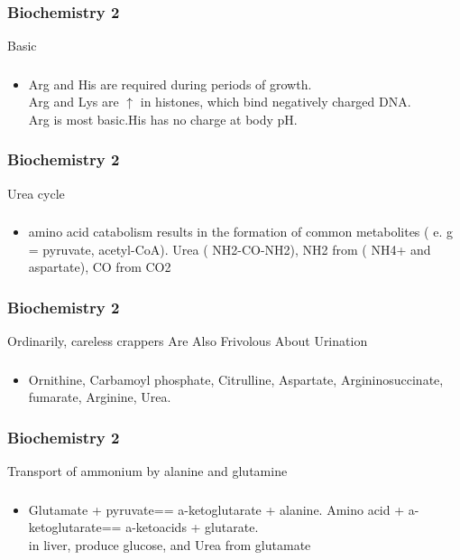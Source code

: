 \documentclass[11pt]{beamer}
\begin{document}
\begin{frame}
 \frametitle{Biochemistry 2}
Basic
\end{frame}

\begin{frame}
 \frametitle{}
\begin{itemize}
\item Arg and His are required during periods of growth. \\ Arg and Lys are ${\uparrow}$ in histones, which bind negatively charged DNA. \\ Arg is most basic.His has no charge at body pH.
\end{itemize}
\end{frame}

\begin{frame}
 \frametitle{Biochemistry 2}
Urea cycle 
\end{frame}

\begin{frame}
 \frametitle{}
\begin{itemize}
\item amino acid catabolism results in the formation of common metabolites ( e. g = pyruvate, acetyl-CoA). Urea ( NH2-CO-NH2), NH2 from ( NH4+ and aspartate), CO from CO2
\end{itemize}
\end{frame}

\begin{frame}
 \frametitle{Biochemistry 2}
Ordinarily, careless crappers Are Also Frivolous About Urination 
\end{frame}

\begin{frame}
 \frametitle{}
\begin{itemize}
\item Ornithine, Carbamoyl phosphate, Citrulline, Aspartate, Argininosuccinate, fumarate, Arginine, Urea. 
\end{itemize}
\end{frame}

\begin{frame}
 \frametitle{Biochemistry 2}
Transport of ammonium by alanine and glutamine
\end{frame}

\begin{frame}
 \frametitle{}
\begin{itemize}
\item  Glutamate + pyruvate== a-ketoglutarate + alanine. Amino acid + a-ketoglutarate== a-ketoacids + glutarate.  \\ in liver, produce glucose, and Urea from glutamate 
\end{itemize}
\end{frame}
\end{document}
